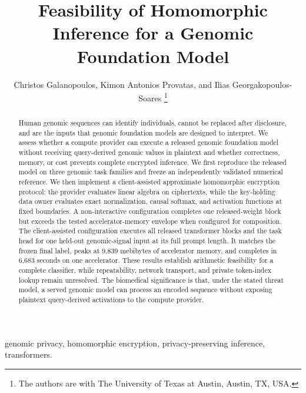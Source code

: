 %

\title{Feasibility of Homomorphic Inference for a Genomic Foundation Model}

\author{Christos Galanopoulos, Kimon Antonios Provatas, and Ilias Georgakopoulos-Soares%
\thanks{The authors are with The University of Texas at Austin, Austin, TX, USA.}%
}

\maketitle

\begin{abstract}
Human genomic sequences can identify individuals, cannot be replaced after disclosure, and are the
inputs that genomic foundation models are designed to interpret. We assess whether a compute
provider can execute a released genomic foundation model without receiving query-derived genomic
values in plaintext and whether
correctness, memory, or cost prevents complete encrypted inference. We first reproduce the released
model on three genomic task families and freeze an independently validated numerical reference. We
then implement a client-assisted approximate homomorphic encryption protocol: the provider evaluates
linear algebra on ciphertexts, while the key-holding data owner evaluates exact normalization,
causal softmax, and activation functions at fixed boundaries. A non-interactive configuration
completes one released-weight block but exceeds the tested accelerator-memory envelope when
configured for composition. The client-assisted configuration executes all released transformer
blocks and the task head for one held-out genomic-signal input at its full prompt length. It matches
the frozen final label, peaks at 9{,}839 mebibytes of accelerator memory, and completes in 6{,}683
seconds on one accelerator. These results establish arithmetic feasibility for a complete
classifier, while repeatability, network transport, and private token-index lookup remain
unresolved. The biomedical significance is that, under the stated threat model, a served genomic
model can process an encoded sequence without exposing plaintext query-derived activations to the
compute provider.
\end{abstract}

\begin{IEEEkeywords}
genomic privacy, homomorphic encryption, privacy-preserving inference, transformers.
\end{IEEEkeywords}
